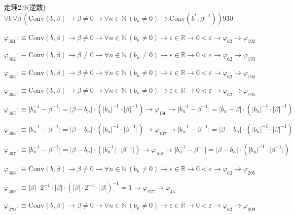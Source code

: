 \begin{fullproof}{定理2.9(逆数)}{$\forall b\,\forall \beta\,(\mathrm{Conv}(b,\beta) \to \beta \neq 0 \to \forall n \in \mathbb{N}\,(b_{n} \neq 0) \to \mathrm{Conv}(b^{\ast},\beta^{-1}))$}{930}
\begin{abbrevlist}
\item $\varphi_{361} :\equiv \mathrm{Conv}(b,\beta) \to \beta \neq 0 \to \forall n \in \mathbb{N}\,(b_{n} \neq 0) \to \varepsilon \in \mathbb{R} \to 0 < \varepsilon \to \varphi_{62} \to \varphi_{192}$
\item $\varphi_{362} :\equiv \mathrm{Conv}(b,\beta) \to \beta \neq 0 \to \forall n \in \mathbb{N}\,(b_{n} \neq 0) \to \varepsilon \in \mathbb{R} \to 0 < \varepsilon \to \varphi_{62} \to \varphi_{193}$
\item $\varphi_{363} :\equiv \mathrm{Conv}(b,\beta) \to \beta \neq 0 \to \forall n \in \mathbb{N}\,(b_{n} \neq 0) \to \varepsilon \in \mathbb{R} \to 0 < \varepsilon \to \varphi_{62} \to \varphi_{194}$
\item $\varphi_{364} :\equiv \mathrm{Conv}(b,\beta) \to \beta \neq 0 \to \forall n \in \mathbb{N}\,(b_{n} \neq 0) \to \varepsilon \in \mathbb{R} \to 0 < \varepsilon \to \varphi_{62} \to \varphi_{195}$
\item $\varphi_{365} :\equiv \lvert b_{n}^{-1} - \beta^{-1} \rvert = \lvert \beta - b_{n} \rvert \cdot (\lvert b_{n} \rvert^{-1} \cdot \lvert \beta \rvert^{-1}) \to \varphi_{166} \to \lvert b_{n}^{-1} - \beta^{-1} \rvert = \lvert b_{n} - \beta \rvert \cdot (\lvert b_{n} \rvert^{-1} \cdot \lvert \beta \rvert^{-1})$
\item $\varphi_{366} :\equiv \lvert b_{n}^{-1} - \beta^{-1} \rvert = \lvert \beta - b_{n} \rvert \cdot (\lvert b_{n} \rvert^{-1} \cdot \lvert \beta^{-1} \rvert) \to \varphi_{167} \to \lvert b_{n}^{-1} - \beta^{-1} \rvert = \lvert \beta - b_{n} \rvert \cdot (\lvert b_{n} \rvert^{-1} \cdot \lvert \beta \rvert^{-1})$
\item $\varphi_{367} :\equiv \lvert b_{n}^{-1} - \beta^{-1} \rvert = \lvert \beta - b_{n} \rvert \cdot (\lvert b_{n}^{-1} \rvert \cdot \lvert \beta^{-1} \rvert) \to \varphi_{168} \to \lvert b_{n}^{-1} - \beta^{-1} \rvert = \lvert \beta - b_{n} \rvert \cdot (\lvert b_{n} \rvert^{-1} \cdot \lvert \beta^{-1} \rvert)$
\item $\varphi_{368} :\equiv \mathrm{Conv}(b,\beta) \to \beta \neq 0 \to \forall n \in \mathbb{N}\,(b_{n} \neq 0) \to \varepsilon \in \mathbb{R} \to 0 < \varepsilon \to \varphi_{62} \to \varphi_{205}$
\item $\varphi_{369} :\equiv \lvert \beta \rvert \cdot 2^{-1} \cdot \lvert \beta \rvert \cdot (\lvert \beta \rvert \cdot 2^{-1} \cdot \lvert \beta \rvert)^{-1} = 1 \to \varphi_{217} \to \varphi_{45}$
\item $\varphi_{370} :\equiv \mathrm{Conv}(b,\beta) \to \beta \neq 0 \to \forall n \in \mathbb{N}\,(b_{n} \neq 0) \to \varepsilon \in \mathbb{R} \to 0 < \varepsilon \to \varphi_{62} \to \varphi_{209}$

\end{abbrevlist}
\end{fullproof}
